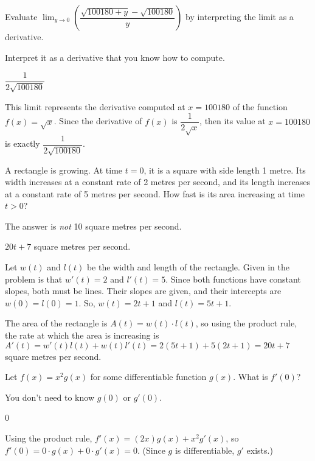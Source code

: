 \begin{Mquestion}[2015Q]
Evaluate $\displaystyle \lim_{y\rightarrow 0}\left(
\dfrac{\sqrt{100180+y}-\sqrt{100180}}{y}\right)$ by interpreting the limit as a derivative.
\end{Mquestion}
\begin{hint} Interpret it as a derivative that you know how to compute.
\end{hint}
\begin{answer} $\dfrac{1}{2\sqrt{100180}}$
\end{answer}
\begin{solution} This limit represents the derivative computed at $x=100180$ of the function
$f(x)=\sqrt{x}$. Since the derivative of $f(x)$ is $\dfrac{1}{2\sqrt{x}}$, then
its value at $x=100180$ is exactly $\dfrac{1}{2\sqrt{100180}}$.
\end{solution}


\begin{Mquestion}
A rectangle is growing. At time $t=0$, it is a square with
           side length 1 metre. Its width increases at a constant rate
           of 2 metres per second, and its length increases at a constant
           rate of 5 metres per second. How fast is its area increasing
           at time $t>0$?\end{Mquestion}
\begin{hint} The answer is \emph{not} 10 square metres per second.
\end{hint}
\begin{answer} $20t+7$ square metres per second.
\end{answer}
\begin{solution} Let $w(t)$ and $l(t)$ be the width and length of the rectangle. Given in the problem is that $w'(t)=2$ and $l'(t)=5$. Since both functions have constant slopes, both must be lines. Their slopes are given, and their intercepts are $w(0)=l(0)=1$. So, $w(t)=2t+1$ and $l(t)=5t+1$.

The area of the rectangle is $A(t)=w(t)\cdot l(t)$, so using the product rule, the rate at which the area is increasing is $A'(t)=w'(t)l(t)+w(t)l'(t)=2(5t+1)+5(2t+1)=20t+7$ square metres per second.
\end{solution}



\begin{question}Let $f(x)=x^2g(x)$ for some differentiable function $g(x)$. What is $ f'(0)$?
\end{question}
\begin{hint} You don't need to know $g(0)$ or $g'(0)$.
\end{hint}
\begin{answer} 0
\end{answer}
\begin{solution}
Using the product rule, $f'(x)=(2x)g(x)+x^2g'(x)$, so $f'(0)=0\cdot g(x)+0\cdot g'(x)=0$. (Since $g$ is differentiable, $g'$ exists.)
\end{solution}



